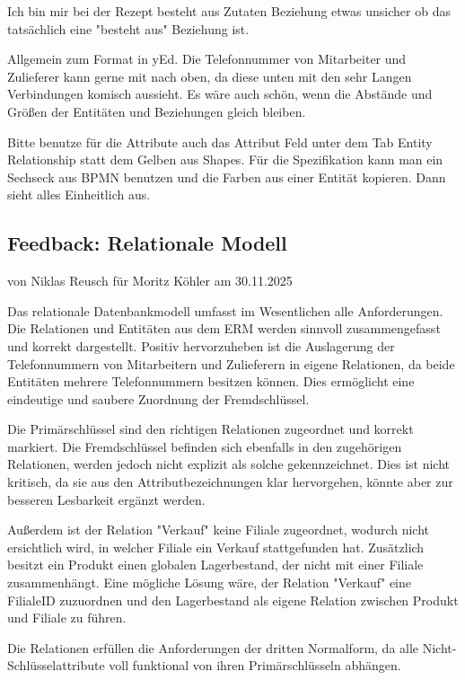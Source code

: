 \documentclass[a4paper]{article}
\begin{document}
Ich bin mir bei der Rezept besteht aus Zutaten Beziehung etwas unsicher ob das tatsächlich eine "besteht aus" Beziehung ist.

Allgemein zum Format in yEd. Die Telefonnummer von Mitarbeiter und Zulieferer kann gerne mit nach oben, da diese unten mit den sehr Langen Verbindungen komisch aussieht. Es wäre auch schön, wenn die Abstände und Größen der Entitäten und Beziehungen gleich bleiben.

Bitte benutze für die Attribute auch das Attribut Feld unter dem Tab Entity Relationship statt dem Gelben aus Shapes. Für die Spezifikation kann man ein Sechseck aus BPMN benutzen und die Farben aus einer Entität kopieren. Dann sieht alles Einheitlich aus.

\newpage
\subsection{Feedback: Relationale Modell}

\begin{flushright}
von Niklas Reusch für Moritz Köhler am 30.11.2025
\end{flushright}

Das relationale Datenbankmodell umfasst im Wesentlichen alle Anforderungen. Die Relationen und Entitäten aus dem ERM werden sinnvoll zusammengefasst und korrekt dargestellt. Positiv hervorzuheben ist die Auslagerung der Telefonnummern von Mitarbeitern und Zulieferern in eigene Relationen, da beide Entitäten mehrere Telefonnummern besitzen können. Dies ermöglicht eine eindeutige und saubere Zuordnung der Fremdschlüssel. 

Die Primärschlüssel sind den richtigen Relationen zugeordnet und korrekt markiert. Die Fremdschlüssel befinden sich ebenfalls in den zugehörigen Relationen, werden jedoch nicht explizit als solche gekennzeichnet. Dies ist nicht kritisch, da sie aus den Attributbezeichnungen klar hervorgehen, könnte aber zur besseren Lesbarkeit ergänzt werden. 

Außerdem ist der Relation "Verkauf" keine Filiale zugeordnet, wodurch nicht ersichtlich wird, in welcher Filiale ein Verkauf stattgefunden hat. Zusätzlich besitzt ein Produkt einen globalen Lagerbestand, der nicht mit einer Filiale zusammenhängt. Eine mögliche Lösung wäre, der Relation "Verkauf" eine FilialeID zuzuordnen und den Lagerbestand als eigene Relation zwischen Produkt und Filiale zu führen. 

Die Relationen erfüllen die Anforderungen der dritten Normalform, da alle Nicht-Schlüsselattribute voll funktional von ihren Primärschlüsseln abhängen. 
\end{document}
